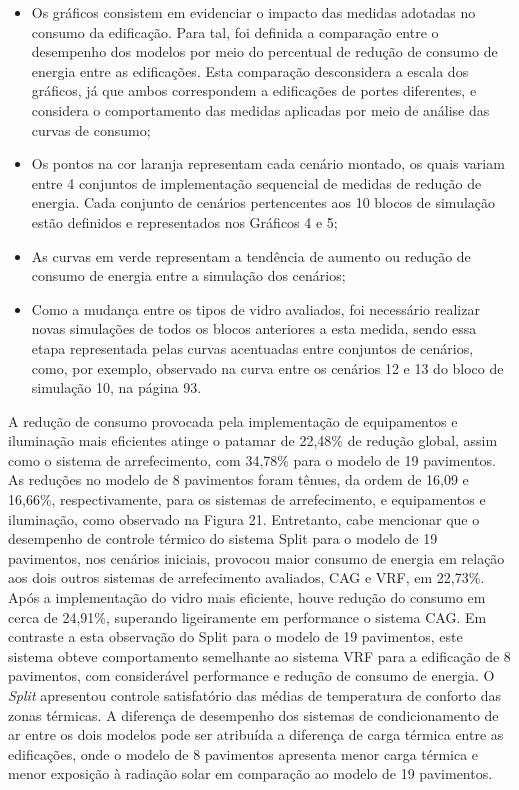 \begin{itemize}
    \item Os gráficos consistem em evidenciar o impacto das medidas adotadas no consumo da edificação. Para tal, foi definida a comparação entre o desempenho dos modelos por meio do percentual de redução de consumo de energia entre as edificações. Esta comparação desconsidera a escala dos gráficos, já que ambos correspondem a edificações de portes diferentes, e considera o comportamento das medidas aplicadas por meio de análise das curvas de consumo;
    \item Os pontos na cor laranja representam cada cenário montado, os quais variam entre 4 conjuntos de implementação sequencial de medidas de redução de energia. Cada conjunto de cenários pertencentes aos 10 blocos de simulação estão definidos e representados nos Gráficos 4 e 5;
    \item As curvas em verde representam a tendência de aumento ou redução de consumo de 
    energia entre a simulação dos cenários;
    \item Como a mudança entre os tipos de vidro avaliados, foi necessário realizar novas simulações de todos os blocos anteriores a esta medida, sendo essa etapa representada pelas curvas acentuadas entre conjuntos de cenários, como, por exemplo, observado na curva entre os cenários 12 e 13 do bloco de simulação 10, na página 93.            
\end{itemize}
\noindent A redução de consumo provocada pela implementação de equipamentos e iluminação mais eficientes atinge o patamar de 22,48\% de redução global, assim como o sistema de arrefecimento, com 34,78\% para o modelo de 19 pavimentos. As reduções no modelo de 8 pavimentos foram tênues, da ordem de 16,09 e 16,66\%, respectivamente, para os sistemas de arrefecimento, e equipamentos e iluminação, como observado na Figura 21.\vspace*{0.3cm} \newline
\noindent Entretanto, cabe mencionar que o desempenho de controle térmico do sistema Split para o modelo de 19 pavimentos, nos cenários iniciais, provocou maior consumo de energia em relação aos dois outros sistemas de arrefecimento avaliados, CAG e VRF, em 22,73\%. Após a implementação do vidro mais eficiente, houve redução do consumo em cerca de 24,91\%, superando ligeiramente em performance o sistema CAG. Em contraste a esta observação do Split para o modelo de 19 pavimentos, este sistema obteve comportamento semelhante ao sistema VRF para a edificação de 8 pavimentos, com considerável performance e redução de consumo de energia. O \textit{Split} apresentou controle satisfatório das médias de temperatura de conforto das zonas térmicas. A diferença de desempenho dos sistemas de condicionamento de ar entre os dois modelos pode ser atribuída a diferença de carga térmica entre as edificações, onde o modelo de 8 pavimentos apresenta menor carga térmica e menor exposição à radiação solar em comparação ao modelo de 19 pavimentos.\vspace*{0.3cm} \newline
